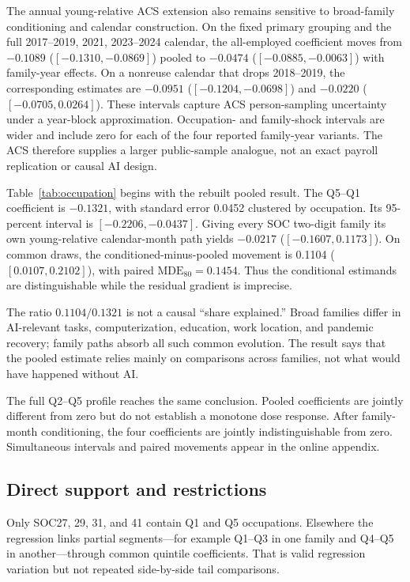The annual young-relative ACS extension also remains sensitive to broad-family
conditioning and calendar construction.  On the fixed primary grouping and the
full 2017--2019, 2021, 2023--2024 calendar, the all-employed coefficient moves
from $-0.1089$ ($[-0.1310,-0.0869]$) pooled to $-0.0474$
($[-0.0885,-0.0063]$) with family-year effects.  On a nonreuse calendar that
drops 2018--2019, the corresponding estimates are $-0.0951$
($[-0.1204,-0.0698]$) and $-0.0220$ ($[-0.0705,0.0264]$).  These intervals
capture ACS person-sampling uncertainty under a year-block approximation.
Occupation- and family-shock intervals are wider and include zero for each of
the four reported family-year variants.  The ACS therefore supplies a larger
public-sample analogue, not an exact payroll replication or causal AI design.

Table~\ref{tab:occupation} begins with the rebuilt pooled result.  The Q5--Q1 coefficient is $-0.1321$, with standard error 0.0452 clustered by occupation.  Its 95-percent interval is $[-0.2206,-0.0437]$.  Giving every SOC two-digit family its own young-relative calendar-month path yields $-0.0217$ ($[-0.1607,0.1173]$).  On common draws, the conditioned-minus-pooled movement is 0.1104 ($[0.0107,0.2102]$), with paired $\mathrm{MDE}_{80}=0.1454$.  Thus the conditional estimands are distinguishable while the residual gradient is imprecise.



The ratio $0.1104/0.1321$ is not a causal ``share explained.''  Broad families differ in AI-relevant tasks, computerization, education, work location, and pandemic recovery; family paths absorb all such common evolution.  The result says that the pooled estimate relies mainly on comparisons across families, not what would have happened without AI.

The full Q2--Q5 profile reaches the same conclusion.  Pooled coefficients are jointly different from zero but do not establish a monotone dose response.  After family-month conditioning, the four coefficients are jointly indistinguishable from zero.  Simultaneous intervals and paired movements appear in the online appendix.

\subsection{Direct support and restrictions}

Only SOC27, 29, 31, and 41 contain Q1 and Q5 occupations.  Elsewhere the regression links partial segments---for example Q1--Q3 in one family and Q4--Q5 in another---through common quintile coefficients.  That is valid regression variation but not repeated side-by-side tail comparisons.

